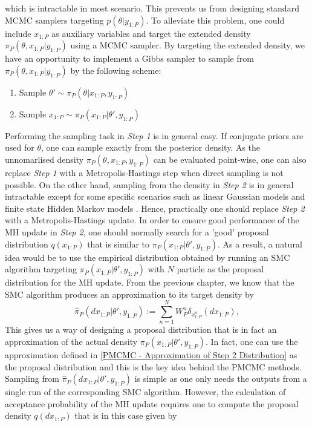 \documentclass[12pt,a4paper]{article}
\begin{document}
which is intractable in most scenario. This prevents us from designing standard MCMC samplers targeting $p(\theta|y_{1:P})$. To alleviate this problem, one could include $x_{1:P}$ as auxiliary variables and target the extended density $\pi_P(\theta,x_{1:P}|y_{1:P})$ using a MCMC sampler. By targeting the extended density, we have an opportunity to implement a Gibbs sampler to sample from $\pi_P(\theta,x_{1:P}|y_{1:P})$ by the following scheme:
\begin{enumerate}[label=\textit{Step \arabic*.},leftmargin=*]
    \item Sample $\theta' \sim \pi_P(\theta|x_{1:P},y_{1:P})$
    \item Sample $x_{1:P} \sim \pi_P(x_{1:P}|\theta',y_{1:P})$
\end{enumerate}
Performing the sampling task in \textit{Step 1} is in general easy. If conjugate priors are used for $\theta$, one can sample exactly from the posterior density. As the unnomarlised density $\pi_P(\theta,x_{1:P},y_{1:P})$ can be evaluated point-wise, one can also replace \textit{Step 1} with a Metropolis-Hastings step when direct sampling is not possible. On the other hand, sampling from the density in \textit{Step 2} is in general intractable except for some specific scenarios such as linear Gaussian models and finite state Hidden Markov models \citep{andrieu2010particle}. Hence, practically one should replace \textit{Step 2} with a Metropolis-Hastings update. In order to ensure good performance of the MH update in \textit{Step 2}, one should normally search for a 'good' proposal distribution $q(x_{1:P})$ that is similar to $\pi_P(x_{1:P}|\theta',y_{1:P})$. As a result, a natural idea would be to use the empirical distribution obtained by running an SMC algorithm targeting $\pi_P(x_{1:P}|\theta',y_{1:P})$ with $N$ particle as the proposal distribution for the MH update. From the previous chapter, we know that the SMC algorithm produces an approximation to its target density by
\begin{equation}
    \label{PMCMC - Approximation of Step 2 Distribution}
    \hat{\pi}_P(dx_{1:P}|\theta',y_{1:P}):=\sum_{n=1}^{N} W_P^n \delta_{x_{1:P}^n}(dx_{1:P}),
\end{equation}
This gives us a way of designing a proposal distribution that is in fact an approximation of the actual density $\pi_P(x_{1:P}|\theta',y_{1:P})$. In fact, one can use the approximation defined in \eqref{PMCMC - Approximation of Step 2 Distribution} as the proposal distribution and this is the key idea behind the PMCMC methods. Sampling from $\hat{\pi}_P(dx_{1:P}|\theta',y_{1:P})$ is simple as one only needs the outputs from a single run of the corresponding SMC algorithm. However, the calculation of acceptance probability of the MH update requires one to compute the proposal density $q(dx_{1:P})$ that is in this case given by 
\end{document}
